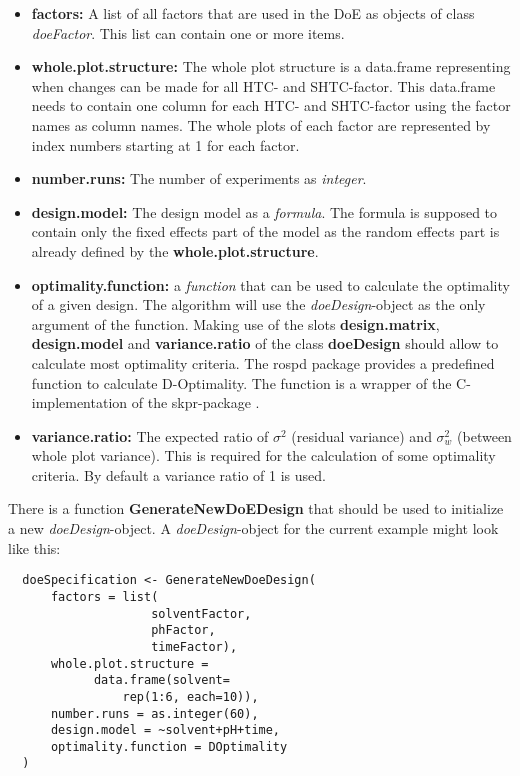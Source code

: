 \begin{itemize}
\item \textbf{factors:} A list of all factors that are used in the DoE as objects of class \textit{doeFactor}. This list can contain one or more items.
\item \textbf{whole.plot.structure:} The whole plot structure is a data.frame representing when changes can be made for all HTC- and SHTC-factor. This data.frame needs to contain one column for each HTC- and SHTC-factor using the factor names as column names. The whole plots of each factor are represented by index numbers starting at 1 for each factor.
\item \textbf{number.runs:} The number of experiments as \textit{integer}.
\item \textbf{design.model:} The design model as a \textit{formula}. The formula is supposed to contain only the fixed effects part of the model as the random effects part is already defined by the \textbf{whole.plot.structure}.
\item \textbf{optimality.function:} a \textit{function} that can be used to calculate the optimality of a given design. The algorithm will use the \textit{doeDesign}-object as the only argument of the function. Making use of the slots \textbf{design.matrix}, \textbf{design.model} and \textbf{variance.ratio} of the class \textbf{doeDesign} should allow to calculate most optimality criteria. The rospd package provides a predefined function to calculate D-Optimality. The function is a wrapper of the C-implementation of the skpr-package \cite{skprpkg}.
\item \textbf{variance.ratio:} The expected ratio of $\sigma^2$ (residual variance) and $\sigma^2_w$ (between whole plot variance). This is required for the calculation of some optimality criteria. By default a variance ratio of 1 is used.
\end{itemize}

There is a function \textbf{GenerateNewDoEDesign} that should be used to initialize a new \textit{doeDesign}-object. A \textit{doeDesign}-object for the current example might look like this:

\begin{verbatim}
  doeSpecification <- GenerateNewDoeDesign(
      factors = list(
      				solventFactor, 
      				phFactor, 
      				timeFactor),
      whole.plot.structure = 
      		data.frame(solvent=
      			rep(1:6, each=10)),
      number.runs = as.integer(60),
      design.model = ~solvent+pH+time,
      optimality.function = DOptimality
  )
\end{verbatim}

